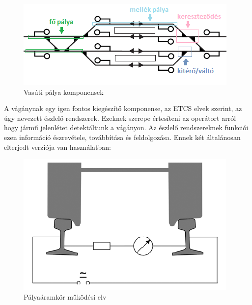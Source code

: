 \documentclass[a4paper,12pt]{article}
\begin{document}
\begin{figure}[htp]
    \centering
    \includegraphics[width=0.5\linewidth]{images/rail_track_types.png}
    \caption[Vasúti pálya komponensek]{Vasúti pálya komponensek}
    \label{fig:rail_track_type}
\end{figure}

A vágánynak egy igen fontos kiegészítő komponense, az ETCS elvek szerint, az úgy nevezett észlelő rendszerek. 
Ezeknek szerepe értesíteni az operátort arról hogy jármű jelenlétet detektáltunk a vágányon. 
Az észlelő rendszereknek funkciói ezen információ észrevétele, továbbítása és feldolgozása.
Ennek két általánosan elterjedt verziója van használatban:
	\begin{figure}[htp]
		\centering
		\includegraphics[width=0.5\linewidth]{images/track_circuit.png}
		\caption[Pályaáramkör működési elv]{Pályaáramkör működési elv}
		\label{fig:track_circuit}
	\end{figure}
\end{document}
